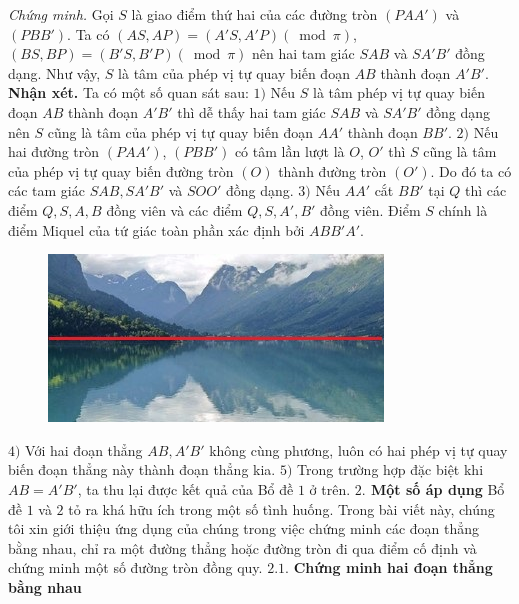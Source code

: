 \begin{multicols}{2}
\begin{figure}[H]
		\vspace*{-20pt}
	\end{figure}
	\textit{Chứng minh.} Gọi $S$ là giao điểm thứ hai của các đường tròn $(PAA')$ và $(PBB')$. Ta có $(AS,AP)=(A'S,A'P) (\bmod  \pi)$, $(BS,BP)=(B'S,B'P)(\bmod  \pi)$ nên hai tam giác $SAB$ và $SA'B'$ đồng dạng. Như vậy, $S$ là tâm của phép vị tự quay biến đoạn $AB$ thành đoạn $A'B'$. 
	\vskip 0.1cm
	\textbf{\color{diendantoanhoc}Nhận xét.}  Ta có một số quan sát sau:
	\vskip 0.1cm
	$1)$ Nếu $S$ là tâm phép vị tự quay biến đoạn $AB$ thành đoạn $A'B'$ thì dễ thấy hai tam giác $SAB$ và $SA'B'$ đồng dạng nên $S$ cũng là tâm của phép vị tự quay biến đoạn $AA'$ thành đoạn $BB'$.
	\vskip 0.1cm 
	$2)$ Nếu hai đường tròn $(PAA')$, $(PBB')$  có tâm lần lượt là $O$, $O'$ thì $S$ cũng là tâm của phép vị tự quay biến đường tròn $(O)$ thành đường tròn $(O')$. Do đó ta có các tam giác $SAB,SA'B'$ và $SOO'$ đồng dạng.
	\vskip 0.1cm
	$3)$ Nếu $AA'$ cắt $BB'$ tại $Q$ thì các điểm $Q,S,A,B$ đồng viên và các điểm $Q,S,A',B'$ đồng viên. Điểm $S$ chính là điểm Miquel của tứ giác toàn phần xác định bởi $ABB'A'$.
	\begin{figure}[H]
		\vspace*{-5pt}
		\centering
		\captionsetup{labelformat= empty, justification=centering}
		\includegraphics[scale=0.75]{3}
		\vspace*{-10pt}
	\end{figure}
	$4)$ Với hai đoạn thẳng $AB,A'B'$ không cùng phương, luôn có hai phép vị tự quay biến đoạn thẳng này thành đoạn thẳng kia.
	\vskip 0.1cm
	$5)$ Trong trường hợp đặc biệt khi $AB=A'B'$, ta thu lại được kết quả của Bổ đề $1$ ở trên.
	\vskip 0.1cm
	\textbf{\color{diendantoanhoc}$2.$  Một số áp dụng}
	\vskip 0.1cm
	Bổ đề $1$ và $2$ tỏ ra khá hữu ích trong một số tình huống. Trong bài viết này, chúng tôi xin giới thiệu ứng dụng của chúng trong việc chứng minh các đoạn thẳng bằng nhau, chỉ ra một đường thẳng hoặc đường tròn đi qua điểm cố định và chứng minh một số đường tròn đồng quy.
	\vskip 0.1cm
	$\pmb{2.1.}$ \textbf{\color{diendantoanhoc}Chứng minh hai đoạn thẳng bằng nhau}
	\vskip 0.1cm

\end{multicols}
